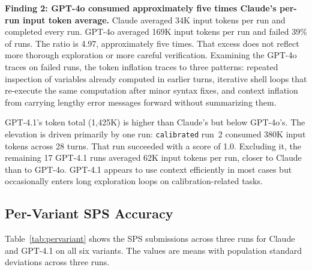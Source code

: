 \documentclass[11pt]{article}
\begin{document}
\textbf{Finding 2: GPT-4o consumed approximately five times Claude's per-run
input token average.}
Claude averaged 34K input tokens per run and completed every run. GPT-4o
averaged 169K input tokens per run and failed 39\% of runs. The ratio is
4.97, approximately five times. That excess does not reflect more thorough
exploration or more careful verification. Examining the GPT-4o traces on
failed runs, the token inflation traces to three patterns: repeated inspection
of variables already computed in earlier turns, iterative shell loops that
re-execute the same computation after minor syntax fixes, and context
inflation from carrying lengthy error messages forward without summarizing
them.

GPT-4.1's token total (1,425K) is higher than Claude's but below GPT-4o's.
The elevation is driven primarily by one run: \texttt{calibrated} run~2
consumed 380K input tokens across 28 turns. That run succeeded with a score
of 1.0. Excluding it, the remaining 17 GPT-4.1 runs averaged 62K input tokens
per run, closer to Claude than to GPT-4o. GPT-4.1 appears to use context
efficiently in most cases but occasionally enters long exploration loops on
calibration-related tasks.

\subsection{Per-Variant SPS Accuracy}
\label{sec:accuracy}

Table~\ref{tab:pervariant} shows the SPS submissions across three runs for
Claude and GPT-4.1 on all six variants. The values are means with population
standard deviations across three runs.
\end{document}

